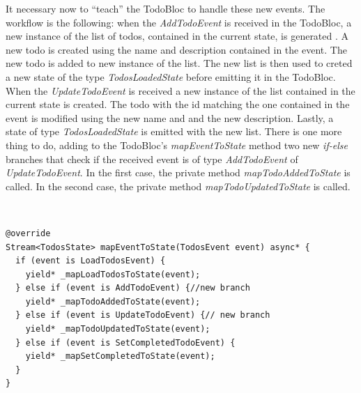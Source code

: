 It necessary now to “teach” the TodoBloc to handle these new events. The workflow is the following: when the \textit{AddTodoEvent} is received in the TodoBloc,  a new instance of the list of todos,  contained in the current state,  is generated . A new todo is created using the name and description contained in the event. The new todo is added to new instance of the list. The new list is then used to creted a new state of the type \textit{TodosLoadedState} before emitting it in the TodoBloc. When the \textit{UpdateTodoEvent} is received a new instance of the list contained in the current state is created. The todo with the id matching the one contained in the event is modified using the new name and and the new description. Lastly, a state of type \textit{TodosLoadedState} is emitted with the new list. There is one more thing to do, adding to the TodoBloc’s \textit{mapEventToState} method two new \textit{if-else} branches that check if the received event is of type \textit{AddTodoEvent} of \textit{UpdateTodoEvent}. In the first case, the private method  \textit{mapTodoAddedToState} is called. In the second case, the private method \textit{mapTodoUpdatedToState} is called.
\begin{code}
\mbox{}\\
 \mbox{}
\label{code:2.14}
\begin{verbatim}
@override
Stream<TodosState> mapEventToState(TodosEvent event) async* {
  if (event is LoadTodosEvent) {
    yield* _mapLoadTodosToState(event);
  } else if (event is AddTodoEvent) {//new branch
    yield* _mapTodoAddedToState(event);
  } else if (event is UpdateTodoEvent) {// new branch
    yield* _mapTodoUpdatedToState(event);
  } else if (event is SetCompletedTodoEvent) {
    yield* _mapSetCompletedToState(event);
  } 
}
\end{verbatim}
\mbox{}
\end{code}

